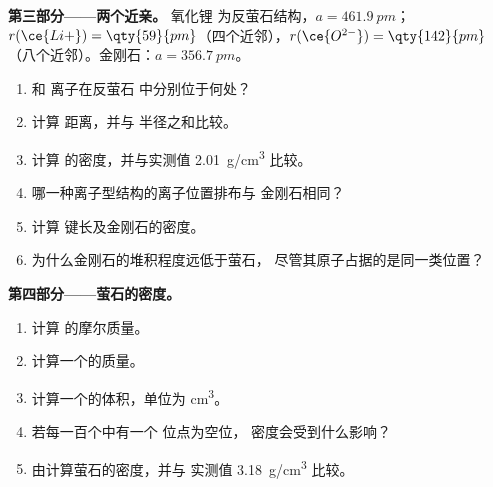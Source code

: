 \begin{problem}
\medskip
\noindent\textbf{第三部分——两个近亲。}
氧化锂  为反萤石结构，$a = \qty{461.9}{pm}$；
$r(\ce{Li+}) = \qty{59}{pm}$（四个近邻），$r(\ce{O^{2-}}) =
\qty{142}{pm}$（八个近邻）。金刚石：$a = \qty{356.7}{pm}$。
\begin{enumerate}[resume]
  \item {} 和  离子在反萤石
        中分别位于何处？
  \item 计算  距离，并与
        半径之和比较。
  \item 计算  的密度，并与实测值
        \qty{2.01}{g/cm^3} 比较。
  \item 哪一种离子型结构的离子位置排布与
        金刚石相同？
  \item 计算  键长及金刚石的密度。
  \item 为什么金刚石的堆积程度远低于萤石，
        尽管其原子占据的是同一类位置？
\end{enumerate}

\medskip
\noindent\textbf{第四部分——萤石的密度。}
\begin{enumerate}[resume]
  \item 计算  的摩尔质量。
  \item 计算一个的质量。
  \item 计算一个的体积，单位为 \unit{cm^3}。
  \item 若每一百个中有一个  位点为空位，
        密度会受到什么影响？
  \item 由计算萤石的密度，并与
        实测值 \qty{3.18}{g/cm^3} 比较。
\end{enumerate}
\end{problem}
